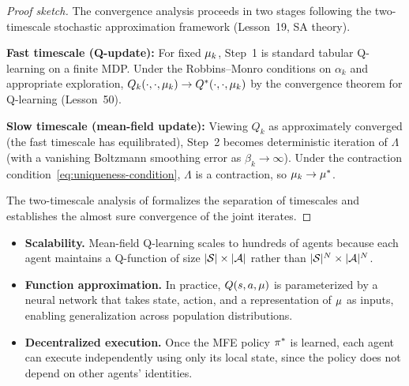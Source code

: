 \documentclass[11pt,a4paper]{article}
\begin{document}
\begin{proof}[Proof sketch]
The convergence analysis proceeds in two stages following the
two-timescale stochastic approximation framework
(Lesson~19, SA theory).

\textbf{Fast timescale (Q-update):} For fixed $\mu_k$,
Step~1 is standard tabular Q-learning on a finite MDP.  Under the
Robbins--Monro conditions on $\alpha_k$ and appropriate
exploration, $Q_k(\cdot, \cdot, \mu_k) \to Q^*(\cdot,
\cdot, \mu_k)$ by the convergence theorem for Q-learning
(Lesson~50).

\textbf{Slow timescale (mean-field update):} Viewing $Q_k$ as
approximately converged (the fast timescale has equilibrated),
Step~2 becomes deterministic iteration of $\Lambda$
(with a vanishing Boltzmann smoothing error as $\beta_k \to
\infty$).  Under the contraction
condition~\eqref{eq:uniqueness-condition}, $\Lambda$ is a
contraction, so $\mu_k \to \mu^*$.

The two-timescale analysis of \citet[Chapter~6]{bensoussan2013}
formalizes the separation of timescales and establishes the almost
sure convergence of the joint iterates.
\end{proof}

\begin{rlconnection}[title={From Theory to Practice in Mean-Field MARL}]
\begin{itemize}[nosep]
  \item \textbf{Scalability.}  Mean-field Q-learning scales to
    hundreds of agents because each agent maintains a Q-function
    of size $|\mathcal{S}| \times |\mathcal{A}|$ rather than
    $|\mathcal{S}|^N \times |\mathcal{A}|^N$.
  \item \textbf{Function approximation.}  In practice, $Q(s, a,
    \mu)$ is parameterized by a neural network that takes
    state, action, and a representation of $\mu$ as inputs,
    enabling generalization across population distributions.
  \item \textbf{Decentralized execution.}  Once the MFE policy
    $\pi^*$ is learned, each agent can execute independently
    using only its local state, since the policy does not depend
    on other agents' identities.
\end{itemize}
\end{rlconnection}
\end{document}

